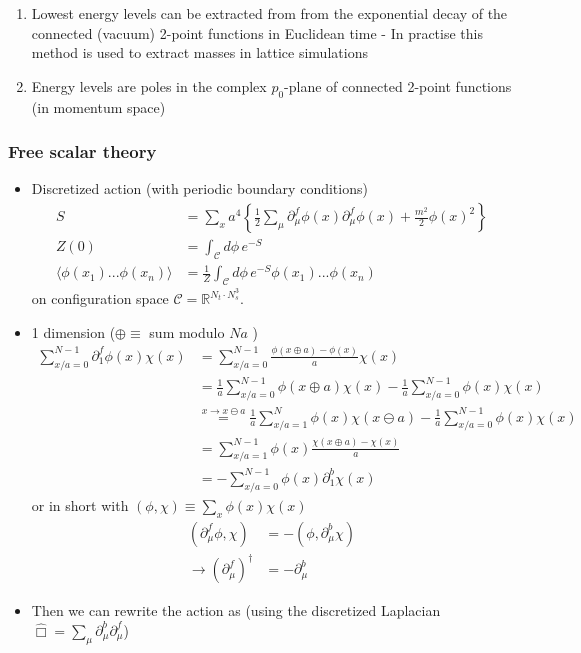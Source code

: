\documentclass[10pt,a4paper]{article}
\theoremstyle{definition}
\begin{document}
\newpage
\begin{enumerate}
\item Lowest energy levels can be extracted from from the exponential decay of the connected (vacuum) 2-point functions in Euclidean time - In practise this method is used to extract masses in lattice simulations
\item Energy levels are poles in the complex $p_0$-plane of connected 2-point functions (in momentum space) 
\end{enumerate}

\newpage
\subsubsection{Free scalar theory}
\begin{itemize}
\item Discretized action (with periodic boundary conditions)
\begin{align}
S&=\sum_x a^4\left\{\frac{1}{2}\sum_\mu\partial_\mu^f\phi(x)\partial_\mu^f\phi(x)+\frac{m^2}{2}\phi(x)^2\right\}\\
Z(0)&=\int_\mathcal{C}d\phi\,e^{-S}\\
\langle\phi(x_1)...\phi(x_n)\rangle&=\frac{1}{Z}\int_\mathcal{C}d\phi\,e^{-S}\phi(x_1)...\phi(x_n)
\end{align}
on configuration space $\mathcal{C}=\mathbb{R}^{N_t\cdot N_s^3}$.
\item 1 dimension ($\oplus\equiv$ sum modulo $Na$ )
\begin{align}
\sum_{x/a=0}^{N-1}\partial_1^f\phi(x)\chi(x)
&=\sum_{x/a=0}^{N-1}\frac{\phi(x\oplus a)-\phi(x)}{a}\chi(x)\\
&=\frac{1}{a}\sum_{x/a=0}^{N-1}\phi(x\oplus a)\chi(x)-\frac{1}{a}\sum_{x/a=0}^{N-1}\phi(x)\chi(x)\\
&\overset{x\rightarrow x\ominus a}{=}\frac{1}{a}\sum_{x/a=1}^{N}\phi(x)\chi(x\ominus a)-\frac{1}{a}\sum_{x/a=0}^{N-1}\phi(x)\chi(x)\\
&=\sum_{x/a=1}^{N-1}\phi(x)\frac{\chi(x\oplus a)-\chi(x)}{a}\\
&=-\sum_{x/a=0}^{N-1}\phi(x)\partial_1^b\chi(x)
\end{align}
or in short with $(\phi,\chi)\equiv\sum_x\phi(x)\chi(x)$
\begin{align}
(\partial_\mu^f\phi,\chi)&=-(\phi,\partial_\mu^b\chi)\\
\rightarrow (\partial_\mu^f)^\dagger&=-\partial_\mu^b
\end{align}
\item Then we can rewrite the action as (using the discretized Laplacian $\hat{\Box}=\sum_\mu\partial_\mu^b\partial_\mu^f$)

\end{itemize}
\end{document}
